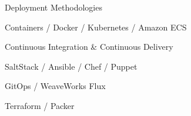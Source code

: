 \begin{skills}{Deployment Methodologies}
    \item Containers / Docker / Kubernetes / Amazon ECS
    \item Continuous Integration \& Continuous Delivery
    \item SaltStack / Ansible / Chef / Puppet
    \item GitOps / WeaveWorks Flux
    \item Terraform / Packer
\end{skills}
